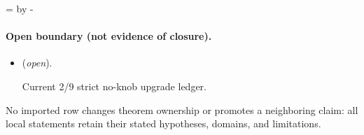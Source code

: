 \documentclass[11pt]{article}
\begin{document}
\par\begingroup{}=\pagegoal\advance{} by -\pagetotal\ifdim\dimen0<7\baselineskip\newpage\fi\endgroup
\paragraph{Open boundary (not evidence of closure).}
\begin{itemize}
\setlength{\itemsep}{0.25em}
\item {} (\emph{open}).\par Current 2/9 strict no-knob upgrade ledger.
\end{itemize}

No imported row changes theorem ownership or promotes a neighboring claim: all local statements retain their stated hypotheses, domains, and limitations.
\end{document}
